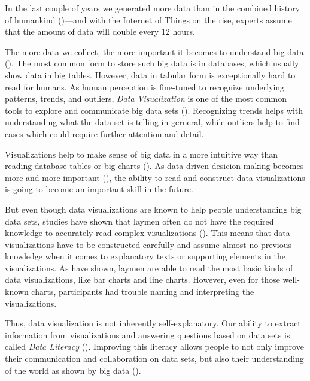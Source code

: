 
In the last couple of years we generated more data than in the combined history of humankind (\cite{helbing2019will})---and with the Internet of Things on the rise, experts assume that the amount of data will double every 12 hours.

The more data we collect, the more important it becomes to understand big data (\cite{bornerDataVisualizationLiteracy2019}). The most common form to store such big data is in databases, which usually show data in big tables. However, data in tabular form is exceptionally hard to read for humans. As human perception is fine-tuned to recognize underlying patterns, trends, and outliers, \emph{Data Visualization} is one of the most common tools to explore and communicate big data sets (\cite{heerTourVisualizationZoo2010}). Recognizing trends helps with understanding what the data set is telling in gerneral, while outliers help to find cases which could require further attention and detail.

Visualizations help to make sense of big data in a more intuitive way than reading database tables or big charts (\cite{donalekImmersiveCollaborativeData2014}). As data-driven desicion-making becomes more and more important (\cite{brynjolfssonStrengthNumbersHow2011}), the ability to read and construct data visualizations is going to become an important skill in the future.

But even though data visualizations are known to help people understanding big data sets, studies have shown that laymen often do not have the required knowledge to accurately read complex visualizations (\cite{bornerInvestigatingAspectsData2016}). This means that data visualizations have to be constructed carefully and assume almost no previous knowledge when it comes to explanatory texts or supporting elements in the visualizations. As \citeauthor{bornerInvestigatingAspectsData2016} have shown, laymen are able to read the most basic kinds of data visualizations, like bar charts and line charts. However, even for those well-known charts, participants had trouble naming and interpreting the visualizations.

Thus, data visualization is not inherently self-explanatory. Our ability to extract information from visualizations and answering questions based on data sets is called \emph{Data Literacy} (\cite{boyPrincipledWayAssessing2014}). Improving this literacy allows people to not only improve their communication and collaboration on data sets, but also their understanding of the world as shown by big data (\cite{bornerDataVisualizationLiteracy2019}). 

